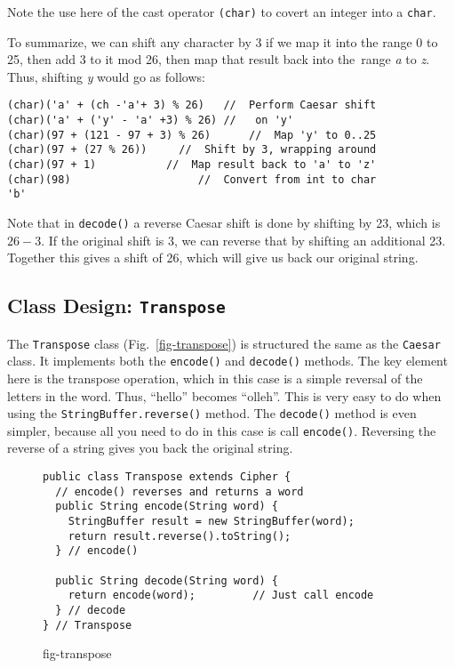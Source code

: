 \noindent Note the use here of the cast operator {\tt (char)} to
covert an integer into a {\tt char}.

To summarize, we can shift any character by 3 if we map it into the
range 0 to 25, then add 3 to it mod 26, then map that result back into
the~range {\it a} to {\it z}. Thus, shifting {\it y} would go as follows:

\begin{jjjlisting}
\begin{lstlisting}
(char)('a' + (ch -'a'+ 3) % 26)   //  Perform Caesar shift
(char)('a' + ('y' - 'a' +3) % 26) //   on 'y'
(char)(97 + (121 - 97 + 3) % 26)      //  Map 'y' to 0..25
(char)(97 + (27 % 26))     //  Shift by 3, wrapping around
(char)(97 + 1)           //  Map result back to 'a' to 'z'
(char)(98)                    //  Convert from int to char
'b'
\end{lstlisting}
\end{jjjlisting}

\noindent  Note that in {\tt decode()} a reverse
Caesar shift is done by shifting by 23, which is $26-3$. If the original
shift is 3, we can reverse that by shifting an additional 23. Together
this gives a shift of 26, which will give us back our original string.

\subsection{Class Design: {\tt Transpose} }
\noindent The {\tt Transpose} class (Fig.~\ref{fig-transpose}) is
structured the same as the {\tt Caesar} class.  It implements both the
{\tt encode()} and {\tt decode()} methods.  The key element here is
the transpose operation, which in this case is a simple reversal of
the letters in the word.  Thus, ``hello'' becomes ``olleh''.  This is
very easy to do when using the {\tt StringBuffer.reverse()} method.  The
{\tt decode()} method is even simpler, because all you need to do in
this case is call {\tt encode()}. Reversing the reverse of a string
gives you back the original string.

\begin{figure}[h!]
\jjjprogstart
\begin{jjjlisting}
\begin{lstlisting}
public class Transpose extends Cipher {
  // encode() reverses and returns a word
  public String encode(String word) {
    StringBuffer result = new StringBuffer(word);
    return result.reverse().toString(); 
  } // encode()

  public String decode(String word) {
    return encode(word);         // Just call encode
  } // decode
} // Transpose
\end{lstlisting}
\end{jjjlisting}
{fig-transpose}
\end{figure}

